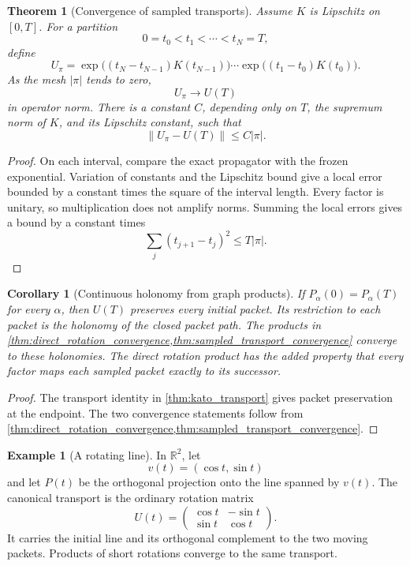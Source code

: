 \documentclass{aomart}
\newtheorem{theorem}{Theorem}[section]
\newtheorem{corollary}[corollary]{Corollary}
\theoremstyle{definition}
\newtheorem{example}[example]{Example}
\theoremstyle{remark}
\begin{document}
\begin{theorem}[Convergence of sampled transports]\label{thm:sampled_transport_convergence}
Assume $K$ is Lipschitz on $[0,T]$.  For a partition
\[
0=t_0<t_1<\cdots<t_N=T,
\]
define
\[
U_\pi
=
\exp\big((t_N-t_{N-1})K(t_{N-1})\big)
\cdots
\exp\big((t_1-t_0)K(t_0)\big).
\]
As the mesh $|\pi|$ tends to zero,
\[
U_\pi\longrightarrow U(T)
\]
in operator norm.  There is a constant $C$, depending only on $T$, the supremum norm of $K$, and its Lipschitz constant, such that
\[
\|U_\pi-U(T)\|
\le C|\pi|.
\]
\end{theorem}

\begin{proof}
On each interval, compare the exact propagator with the frozen exponential.  Variation of constants and the Lipschitz bound give a local error bounded by a constant times the square of the interval length.  Every factor is unitary, so multiplication does not amplify norms.  Summing the local errors gives a bound by a constant times
\[
\sum_j(t_{j+1}-t_j)^2
\le
T|\pi|.
\]
\end{proof}

\begin{corollary}[Continuous holonomy from graph products]\label{cor:continuous_holonomy}
If $P_\alpha(0)=P_\alpha(T)$ for every $\alpha$, then $U(T)$ preserves every initial packet.  Its restriction to each packet is the holonomy of the closed packet path.  The products in \cref{thm:direct_rotation_convergence,thm:sampled_transport_convergence} converge to these holonomies.  The direct rotation product has the added property that every factor maps each sampled packet exactly to its successor.
\end{corollary}

\begin{proof}
The transport identity in \cref{thm:kato_transport} gives packet preservation at the endpoint.  The two convergence statements follow from \cref{thm:direct_rotation_convergence,thm:sampled_transport_convergence}.
\end{proof}

\begin{example}[A rotating line]\label{ex:rotating_line}
In $\mathbb R^2$, let
\[
v(t)=(\cos t,\sin t)
\]
and let $P(t)$ be the orthogonal projection onto the line spanned by $v(t)$.  The canonical transport is the ordinary rotation matrix
\[
U(t)=
\begin{pmatrix}
\cos t&-\sin t\\
\sin t&\cos t
\end{pmatrix}.
\]
It carries the initial line and its orthogonal complement to the two moving packets.  Products of short rotations converge to the same transport.
\end{example}
\end{document}

